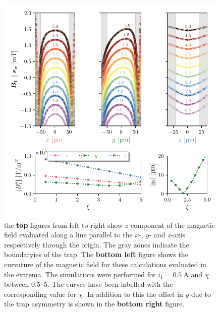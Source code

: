 \begin{figure}
    \centering
    \includegraphics{figures/data/magnetic_field_curvature.pdf}
    \caption{the \textbf{top} figures from left to right show $z$-component of the magnetic field evaluated along a line parallel to the $x$-, $y$- and $z$-axis respectively through the origin. The gray zones indicate the boundaryies of the trap. The \textbf{bottom left} figure shows the curvature of the magnetic field for these calculations evaluated in the extrema. The simulations were performed for $i_1=\qty{0.5}{\ampere}$ and $\chi$ between \numrange{0.5}{5}. The curves have been labelled with the corresponding value for $\chi$. In addition to this the offset in $y$ due to the trap asymmetry is shown in the \textbf{bottom right} figure.}
    \label{fig:magnetic-field-curvature}
\end{figure}

